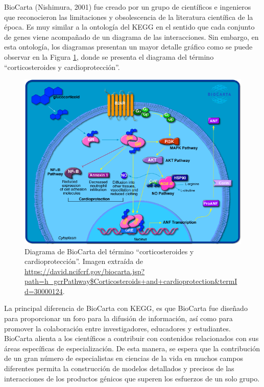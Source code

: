 \documentclass[12pt,twoside]{reedthesis}
\begin{document}
BioCarta (Nishimura, 2001) fue creado por un grupo de científicos e ingenieros que reconocieron las limitaciones y obsolescencia de la literatura científica de la época. Es muy similar a la ontología del KEGG en el sentido que cada conjunto de genes viene acompañado de un diagrama de las interacciones. Sin embargo, en esta ontología, los diagramas presentan un mayor detalle gráfico como se puede observar en la Figura \ref{fig:biocartaCorticosPathw}, donde se presenta el diagrama del término ``corticosteroides y cardioprotección''.
\begin{figure}

{\centering \includegraphics[width=1\linewidth]{images/biocarta_corticosteroids_pathway} 

}

\caption{Diagrama de BioCarta del término ``corticosteroides y cardioprotección''. Imagen extraída de \url{https://david.ncifcrf.gov/biocarta.jsp?path=h_gcrPathway$Corticosteroids+and+cardioprotection\&termId=30000124}.}\label{fig:biocartaCorticosPathw}
\end{figure}


\par

La principal diferencia de BioCarta con KEGG, es que BioCarta fue diseñado para proporcionar un foro para la difusión de información, así como para promover la colaboración entre investigadores, educadores y estudiantes. BioCarta alienta a los científicos a contribuir con contenidos relacionados con sus áreas específicas de especialización. De esta manera, se espera que la contribución de un gran número de especialistas en ciencias de la vida en muchos campos diferentes permita la construcción de modelos detallados y precisos de las interacciones de los productos génicos que superen los esfuerzos de un solo grupo.
\end{document}
